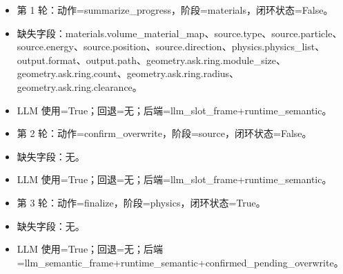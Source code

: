 \documentclass[11pt]{ctexart}
\begin{document}
\begin{itemize}
\item 第 1 轮：动作=summarize\_progress，阶段=materials，闭环状态=False。
\item 缺失字段：materials.volume\_material\_map、source.type、source.particle、source.energy、source.position、source.direction、physics.physics\_list、output.format、output.path、geometry.ask.ring.module\_size、geometry.ask.ring.count、geometry.ask.ring.radius、geometry.ask.ring.clearance。
\item LLM 使用=True；回退=无；后端=llm\_slot\_frame+runtime\_semantic。
\item 第 2 轮：动作=confirm\_overwrite，阶段=source，闭环状态=False。
\item 缺失字段：无。
\item LLM 使用=True；回退=无；后端=llm\_slot\_frame+runtime\_semantic。
\item 第 3 轮：动作=finalize，阶段=physics，闭环状态=True。
\item 缺失字段：无。
\item LLM 使用=True；回退=无；后端=llm\_semantic\_frame+runtime\_semantic+confirmed\_pending\_overwrite。
\end{itemize}
\end{document}
